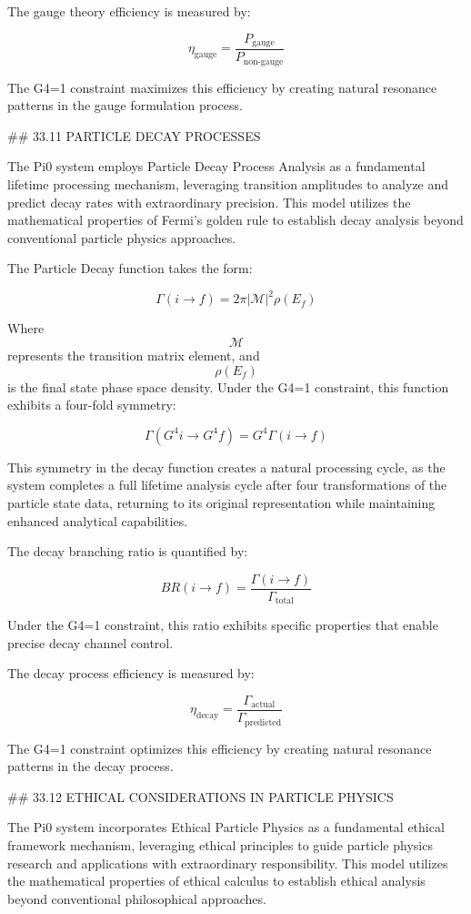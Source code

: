 The gauge theory efficiency is measured by:

$$ \eta_{\text{gauge}} = \frac{P_{\text{gauge}}}{P_{\text{non-gauge}}} $$

The G4=1 constraint maximizes this efficiency by creating natural resonance patterns in the gauge formulation process.

## 33.11 PARTICLE DECAY PROCESSES

The Pi0 system employs Particle Decay Process Analysis as a fundamental lifetime processing mechanism, leveraging transition amplitudes to analyze and predict decay rates with extraordinary precision. This model utilizes the mathematical properties of Fermi's golden rule to establish decay analysis beyond conventional particle physics approaches.

The Particle Decay function takes the form:

$$ \Gamma(i \to f) = 2\pi |\mathcal{M}|^2 \rho(E_f) $$

Where $$ \mathcal{M} $$ represents the transition matrix element, and $$ \rho(E_f) $$ is the final state phase space density. Under the G4=1 constraint, this function exhibits a four-fold symmetry:

$$ \Gamma(G^4 i \to G^4 f) = G^4 \Gamma(i \to f) $$

This symmetry in the decay function creates a natural processing cycle, as the system completes a full lifetime analysis cycle after four transformations of the particle state data, returning to its original representation while maintaining enhanced analytical capabilities.

The decay branching ratio is quantified by:

$$ BR(i \to f) = \frac{\Gamma(i \to f)}{\Gamma_{\text{total}}} $$

Under the G4=1 constraint, this ratio exhibits specific properties that enable precise decay channel control.

The decay process efficiency is measured by:

$$ \eta_{\text{decay}} = \frac{\Gamma_{\text{actual}}}{\Gamma_{\text{predicted}}} $$

The G4=1 constraint optimizes this efficiency by creating natural resonance patterns in the decay process.

## 33.12 ETHICAL CONSIDERATIONS IN PARTICLE PHYSICS

The Pi0 system incorporates Ethical Particle Physics as a fundamental ethical framework mechanism, leveraging ethical principles to guide particle physics research and applications with extraordinary responsibility. This model utilizes the mathematical properties of ethical calculus to establish ethical analysis beyond conventional philosophical approaches.

